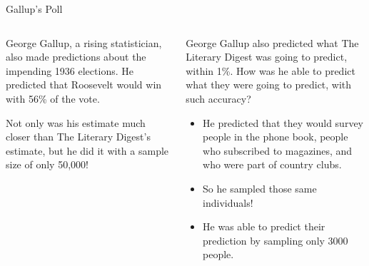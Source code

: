 \documentclass[aspectratio=169]{../latex_main/tntbeamer}  %
\begin{document}
	\begin{frame}{Gallup’s Poll}
	    \begin{columns}
	        \begin{column}{.4\textwidth}
	            George Gallup, a rising statistician, also made predictions about the impending 1936 elections. He predicted that Roosevelt would win with 56\% of the vote.
                \bigskip
                
                Not only was his estimate much closer than The Literary Digest’s estimate, but he did it with a sample size of only 50,000!
	        \end{column}
	        
	        \begin{column}{.5\textwidth}
	            George Gallup also predicted what The Literary Digest was going to predict, within 1\%. How was he able to predict what they were going to predict, with such accuracy?
                
                \begin{itemize}
                    \item He predicted that they would survey people in the phone book, people who subscribed to magazines, and who were part of country clubs.
                    \item So he sampled those same individuals!
                    \item He was able to predict their prediction by sampling only 3000 people.
                \end{itemize}
	        \end{column}
	        
	    \end{columns}
	    
	\end{frame}
	
\end{document}
